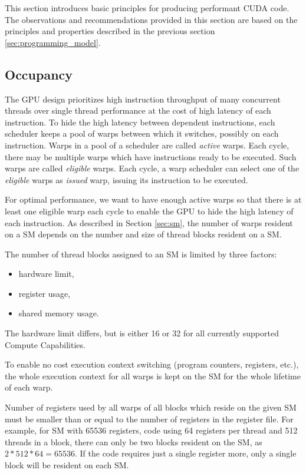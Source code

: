 This section introduces basic principles for producing performant CUDA code.
The observations and recommendations provided in this section are based on the principles and properties described in the previous section \ref{sec:programming_model}.

\subsection{Occupancy}
\label{sec:occupancy}

The GPU design prioritizes high instruction throughput of many concurrent threads over single thread performance at the cost of high latency of each instruction. To hide the high latency between dependent instructions, each scheduler keeps a pool of warps between which it switches, possibly on each instruction. Warps in a pool of a scheduler are called \textit{active} warps.
Each cycle, there may be multiple warps which have instructions ready to be executed. Such warps are called \textit{eligible} warps.
Each cycle, a warp scheduler can select one of the \textit{eligible} warps as \textit{issued} warp, issuing its instruction to be executed.

For optimal performance, we want to have enough active warps so that there is at least one eligible warp each cycle to enable the GPU to hide the high latency of each instruction. As described in Section \ref{sec:sm}, the number of warps resident on a SM depends on the number and size of thread blocks resident on a SM.

The number of thread blocks assigned to an SM is limited by three factors:

\begin{itemize}
	\item hardware limit,
	\item register usage,
	\item shared memory usage.
\end{itemize}

The hardware limit differs, but is either 16 or 32 for all currently supported Compute Capabilities. 

To enable no cost execution context switching (program counters, registers, etc.), the whole execution context for all warps is kept on the SM for the whole lifetime of each warp. 


Number of registers used by all warps of all blocks which reside on the given SM must be smaller than or equal to the number of registers in the register file. For example, for SM with 65536 registers, code using 64 registers per thread and 512 threads in a block, there can only be two blocks resident on the SM, as $2*512*64 = 65536$. If the code requires just a single register more, only a single block will be resident on each SM.

